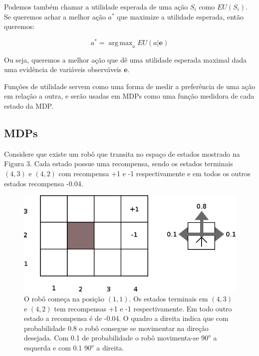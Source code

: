 \documentclass[a4paper,10pt]{article}
\DeclareMathOperator*{\argmax}{arg\,max}
\theoremstyle{plain}
\begin{document}
Podemos também chamar a utilidade esperada de uma ação $S_i$ como $EU(S_i)$. Se queremos achar a
melhor ação $a^*$ que maximize a utilidade esperada, então queremos:

\begin{equation*}
  a^* = \argmax_a EU(a|\mathbf{e})
\end{equation*}

Ou seja, queremos a melhor ação que dê uma utilidade esperada maximal dada uma evidência de
variáveis observáveis $\mathbf{e}$.

Funções de utilidade servem como uma forma de medir a preferência de uma ação em relação a outra,
e serão usadas em MDPs como uma função medidora de cada estado da MDP.

\newpage

\subsection{MDPs}

Considere que existe um robô que transita no espaço de estados mostrado na Figura 3. Cada estado
possue uma recompensa, sendo os estados terminais $(4, 3)$ e $(4, 2)$ com recompensa +1 e -1
respectivamente e em todos os outros estados recompensa -0.04.

\begin{figure}[h]
  \begin{center}
    \includegraphics[scale=0.4]{imgs/grid4x3.png}
  \end{center}
  \caption{O robô começa na posição $(1, 1)$. Os estados terminais em $(4, 3)$ e $(4, 2)$ tem
  recompensas +1 e -1 respectivamente. Em todo outro estado a recompensa é de -0.04. O quadro a
  direita indica que com probabilidade 0.8 o robô consegue se movimentar na direção desejada. Com
  0.1 de probabilidade o robô movimenta-se $90^o$ a esquerda e com 0.1 $90^o$ a direita.}
\end{figure}
\end{document}
